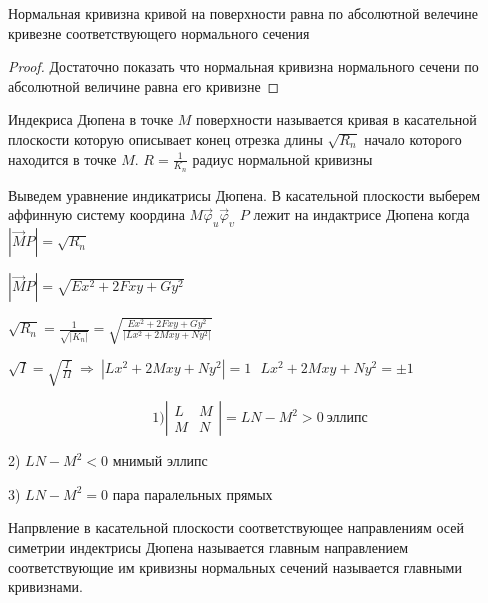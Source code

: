 \begin{theorem}
  Нормальная кривизна кривой на поверхности равна по абсолютной велечине
  кривезне соответствующего нормального сечения
\end{theorem}

\begin{proof}
  Достаточно показать что нормальная кривизна нормального сечени по
  абсолютной величине равна его кривизне
\end{proof}

\begin{define}
  Индекриса Дюпена в точке $M$ поверхности называется кривая в касательной
  плоскости которую описывает конец отрезка длины $\sqrt{R_n}$ начало
  которого находится в точке $M$. $R = \frac{1}{K_n}$ радиус нормальной
  кривизны
\end{define}

Выведем уравнение индикатрисы Дюпена. В касательной плоскости выберем аффинную
систему координа $M \vec \varphi_u \vec \varphi_{\upsilon}$ $P$ лежит на
индактрисе Дюпена когда $|\overrightarrow MP| = \sqrt{R_n}$

$|\overrightarrow MP| = \sqrt{Ex^2 + 2Fxy + Gy^2}$

$\sqrt{R_n} = \frac{1}{\sqrt{|K_n|}} = \sqrt{\frac{Ex^2 + 2Fxy + Gy^2}{
|Lx^2 + 2Mxy + Ny^2|}}$

$\sqrt{I} = \sqrt{\frac{I}{II}} ~ \Rightarrow ~ |Lx^2 + 2Mxy + Ny^2| = 1 ~~~
Lx^2 + 2Mxy + Ny^2 = \pm 1$

$$
1)
\left|
\begin{array}{cc}
  L & M \\
  M & N
\end{array}
\right| = LN - M^2 > 0 ~ \text{эллипс}
$$

2) $LN - M^2 < 0$ мнимый эллипс

3) $LN - M^2 = 0$ пара паралельных прямых

\begin{define}
  Напрвление в касательной плоскости соответствующее направлениям осей симетрии
  индектрисы Дюпена называется главным направлением соответствующие им кривизны
  нормальных сечений называется главными кривизнами.
\end{define}

